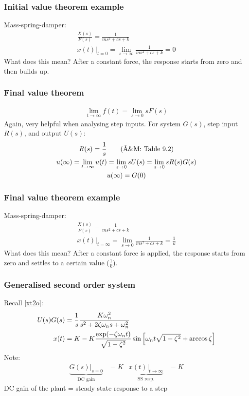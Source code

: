 \documentclass{beamer-control}
\begin{document}
\begin{frame}
\frametitle{Initial value theorem example}

Mass-spring-damper:
\begin{gather}
\frac{X(s)}{F(s)} = \frac{1}{ms^2+cs+k} \\
x(t)|_{t=0} = \lim_{s\to\infty} \frac{1}{ms^2+cs+k} = 0
\end{gather}
What does this mean? After a constant force, the response starts from zero and then builds up.

\bigskip
{}
\end{frame}

\begin{frame}
\frametitle{Final value theorem}

\begin{gather}
\lim_{t\to\infty} f(t) = \lim_{s\to0} s F(s)
\end{gather}
Again, very helpful when analysing step inputs. For system $G(s)$, step input $R(s)$, and output $U(s)$:
\begin{gather}
R(s) = \frac{1}{s} \qquad\text{(\AA\&M: Table 9.2)}\\
u(\infty) = \lim_{t\to\infty} u(t) = \lim_{s\to0} s U(s) = \lim_{s\to0} s R(s)G(s) \\
u(\infty) = G(0)
\end{gather}
\end{frame}

\begin{frame}
\frametitle{Final value theorem example}

Mass-spring-damper:
\begin{gather}
\frac{X(s)}{F(s)} = \frac{1}{ms^2+cs+k} \\
x(t)|_{t=\infty} = \lim_{s\to0} \frac{1}{ms^2+cs+k} = \frac{1}{k}
\end{gather}
What does this mean? After a constant force is applied, the response starts from zero and settles to a certain value ($\frac{1}{k}$).

\bigskip
{}
\end{frame}

\begin{frame}
\frametitle{Generalised second order system}
Recall \eqref{xt2o}:
\begin{align}
U(s)G(s) & = \frac{1}{s}\frac{K\omega_n^2}{s^2+2\zeta\omega_ns+\omega_n^2} \\
x(t) &= K - K\frac{\exp(-\zeta\omega_n t)}{\sqrt{1-\zeta^2}}\sin\left[\omega_n t\sqrt{1-\zeta^2}+\arccos\zeta\right]
\end{align}
Note:
\begin{align}
\underbrace{G(s)|_{s=0}}_{\text{DC gain}} &= K & \underbrace{x(t)|_{t\to \infty}}_{\text{SS resp.}} &= K
\end{align}
DC gain of the plant = steady state response to a step
\end{frame}

\SUMMARYFRAME
\FINALE
\end{document}
